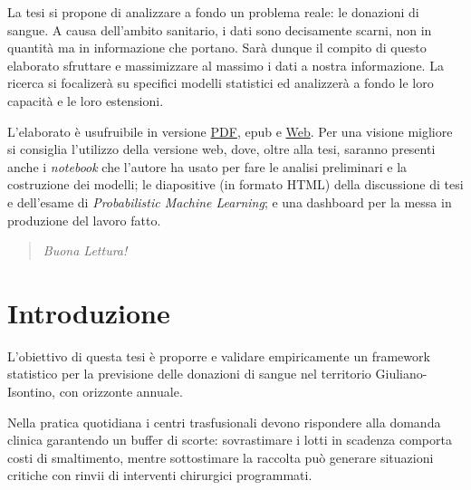 \documentclass[
  italian,
  a4paper,
  a4paper,
  twoside,
  open=right,
  12pt]{scrbook}
\theoremstyle{definition}
\theoremstyle{remark}
\begin{document}

La tesi si propone di analizzare a fondo un problema reale: le donazioni
di sangue. A causa dell'ambito sanitario, i dati sono decisamente
scarni, non in quantità ma in informazione che portano. Sarà dunque il
compito di questo elaborato sfruttare e massimizzare al massimo i dati a
nostra informazione. La ricerca si focalizerà su specifici modelli
statistici ed analizzerà a fondo le loro capacità e le loro estensioni.

\begin{tcolorbox}[enhanced jigsaw, breakable, colframe=quarto-callout-tip-color-frame, toprule=.15mm, title=\textcolor{quarto-callout-tip-color}{\faLightbulb}\hspace{0.5em}{Consiglio}, arc=.35mm, colback=white, bottomrule=.15mm, bottomtitle=1mm, colbacktitle=quarto-callout-tip-color!10!white, toptitle=1mm, titlerule=0mm, opacityback=0, rightrule=.15mm, opacitybacktitle=0.6, leftrule=.75mm, left=2mm, coltitle=black]

L'elaborato è usufruibile in versione
\href{https://www.erikdeluca.it/Blood-Donors/thesis/master_thesis.pdf}{PDF},
epub e \href{https://www.erikdeluca.it/Blood-Donors/thesis/}{Web}. Per
una visione migliore si consiglia l'utilizzo della versione web, dove,
oltre alla tesi, saranno presenti anche i \emph{notebook} che l'autore
ha usato per fare le analisi preliminari e la costruzione dei modelli;
le diapositive (in formato HTML) della discussione di tesi e dell'esame
di \emph{Probabilistic Machine Learning}; e una dashboard per la messa
in produzione del lavoro fatto.

\end{tcolorbox}

\begin{quote}
\emph{Buona Lettura!}
\end{quote}


\chapter{Introduzione}\label{introduzione}

L'obiettivo di questa tesi è proporre e validare empiricamente un
framework statistico per la previsione delle donazioni di sangue nel
territorio Giuliano-Isontino, con orizzonte annuale.

Nella pratica quotidiana i centri trasfusionali devono rispondere alla
domanda clinica garantendo un buffer di scorte: sovrastimare i lotti in
scadenza comporta costi di smaltimento, mentre sottostimare la raccolta
può generare situazioni critiche con rinvii di interventi chirurgici
programmati.
\end{document}
